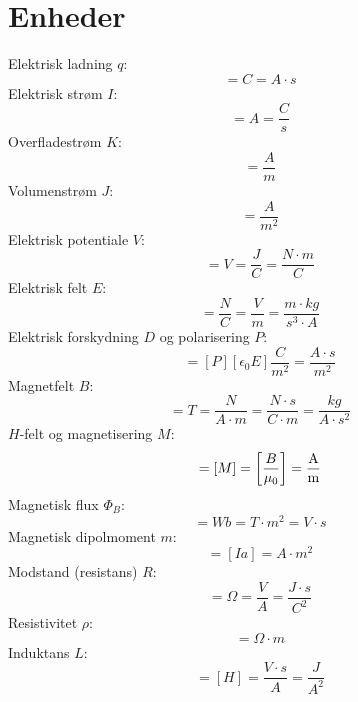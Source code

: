\documentclass[]{article}
\theoremstyle{definition}
\begin{document}
\section{Enheder}
Elektrisk ladning $q$:
\begin{equation*}
	[q] = \unit{C} = \unit{A \cdot s}
\end{equation*}
Elektrisk strøm $I$:
\begin{equation*}
	[I] = \unit{A} = \unit{\frac{C}{s}}
\end{equation*}
Overfladestrøm $K$:
\begin{equation*}
	[K] = \unit{\frac{A}{m}}
\end{equation*}
Volumenstrøm $J$:
\begin{equation*}
	[J] = \unit{\frac{A}{m^2}}
\end{equation*}
Elektrisk potentiale $V$:
\begin{equation*}
	[V] = \unit{V} = \unit{\frac{J}{C}} = \unit{\frac{N \cdot m}{C}}
\end{equation*}
Elektrisk felt $E$:
\begin{equation*}
	[E] = \unit{\frac{N}{C}} = \unit{\frac{V}{m}} = \unit{\frac{m\cdot kg}{s^3 \cdot A}}
\end{equation*}
Elektrisk forskydning $D$ og polarisering $P$:
\begin{equation*}
	[D] = [P] [\epsilon_0 E] \unit{\frac{C}{m^2}} = \unit{\frac{A \cdot s}{m^2}}
\end{equation*}
Magnetfelt $B$:
\begin{equation*}
	[B] = \unit{T} = \unit{\frac{N}{A \cdot m} =  \unit{\frac{N \cdot s}{C \cdot m}} = \unit{\frac{kg}{A \cdot s^2}}}
\end{equation*}
$H$-felt og magnetisering $M$:
\begin{equation*}
	[H] = [M] = \qty[\frac{B}{\mu_0}] = \unit{\frac{A}{m}}
\end{equation*}
Magnetisk flux $ \Phi_B$:
\begin{equation*}
	[\Phi_B] = \unit{Wb} = \unit{T \cdot m^2} = \unit{V \cdot s}
\end{equation*}
Magnetisk dipolmoment $m$:
\begin{equation*}
	[m] = [Ia] = \unit{A \cdot m^2}
\end{equation*}
Modstand (resistans) $R$:
\begin{equation*}
	[R] = \unit{\Omega} = \unit{\frac{V}{A}} = \unit{\dfrac{J \cdot s}{C^2}}
\end{equation*}
Resistivitet $\rho$:
\begin{equation*}
	[\rho] = \unit{\Omega \cdot m}
\end{equation*}
Induktans $L$:
\begin{equation*}
	[L] = [H] = \unit{\frac{V\cdot s}{A}} = \unit{\frac{J}{A^2}}
\end{equation*}
\end{document}

